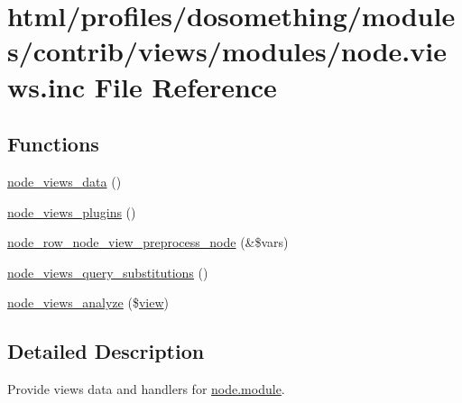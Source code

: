 \hypertarget{node_8views_8inc}{
\section{html/profiles/dosomething/modules/contrib/views/modules/node.views.inc File Reference}
\label{node_8views_8inc}
}
\subsection*{Functions}
\begin{DoxyCompactItemize}
\item 
\hyperlink{node_8views_8inc_a5e6beb23be547a792dba68f1066d4b9d}{node\_\-views\_\-data} ()
\item 
\hyperlink{node_8views_8inc_abad6697258bb04f10bbb73608ab1f52c}{node\_\-views\_\-plugins} ()
\item 
\hyperlink{node_8views_8inc_ac9a8871975d77054c1ba15c283398493}{node\_\-row\_\-node\_\-view\_\-preprocess\_\-node} (\&\$vars)
\item 
\hyperlink{node_8views_8inc_a207da742d80ba74315d7084eeed285b9}{node\_\-views\_\-query\_\-substitutions} ()
\item 
\hyperlink{node_8views_8inc_a6060098a01aedf1a74dba4720f806654}{node\_\-views\_\-analyze} (\$\hyperlink{classview}{view})
\end{DoxyCompactItemize}


\subsection{Detailed Description}
Provide views data and handlers for \hyperlink{node_8module}{node.module}. 

